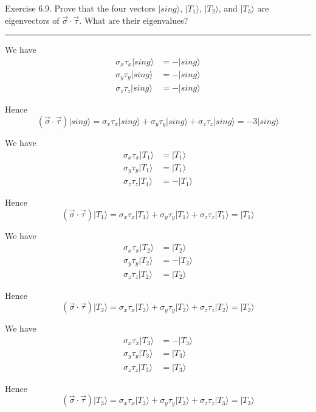 \documentclass[12pt]{article}
\begin{document}
Exercise 6.9.
Prove that the four vectors $|sing\rangle$, $|T_1\rangle$,
$|T_2\rangle$, and $|T_3\rangle$ are eigenvectors of
$\vec\sigma\cdot\vec\tau$.
What are their eigenvalues?

\bigskip
\hrule

\bigskip
We have
\begin{align*}
\sigma_x\tau_x|sing\rangle&=-|sing\rangle
\\
\sigma_y\tau_y|sing\rangle&=-|sing\rangle
\\
\sigma_z\tau_z|sing\rangle&=-|sing\rangle
\end{align*}

Hence
\begin{equation*}
(\vec\sigma\cdot\vec\tau)|sing\rangle
=\sigma_x\tau_x|sing\rangle+\sigma_y\tau_y|sing\rangle+\sigma_z\tau_z|sing\rangle
=-3|sing\rangle
\end{equation*}

We have
\begin{align*}
\sigma_x\tau_x|T_1\rangle&=|T_1\rangle
\\
\sigma_y\tau_y|T_1\rangle&=|T_1\rangle
\\
\sigma_z\tau_z|T_1\rangle&=-|T_1\rangle
\end{align*}

Hence
\begin{equation*}
(\vec\sigma\cdot\vec\tau)|T_1\rangle
=\sigma_x\tau_x|T_1\rangle+\sigma_y\tau_y|T_1\rangle+\sigma_z\tau_z|T_1\rangle
=|T_1\rangle
\end{equation*}

We have
\begin{align*}
\sigma_x\tau_x|T_2\rangle&=|T_2\rangle
\\
\sigma_y\tau_y|T_2\rangle&=-|T_2\rangle
\\
\sigma_z\tau_z|T_2\rangle&=|T_2\rangle
\end{align*}

Hence
\begin{equation*}
(\vec\sigma\cdot\vec\tau)|T_2\rangle
=\sigma_x\tau_x|T_2\rangle+\sigma_y\tau_y|T_2\rangle+\sigma_z\tau_z|T_2\rangle
=|T_2\rangle
\end{equation*}

We have
\begin{align*}
\sigma_x\tau_x|T_3\rangle&=-|T_3\rangle
\\
\sigma_y\tau_y|T_3\rangle&=|T_3\rangle
\\
\sigma_z\tau_z|T_3\rangle&=|T_3\rangle
\end{align*}

Hence
\begin{equation*}
(\vec\sigma\cdot\vec\tau)|T_3\rangle
=\sigma_x\tau_x|T_3\rangle+\sigma_y\tau_y|T_3\rangle+\sigma_z\tau_z|T_3\rangle
=|T_3\rangle
\end{equation*}
\end{document}
